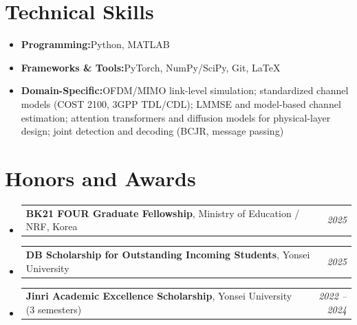 \documentclass[a4paper,11pt]{article}
\makeatletter
\newcommand{\resumeItem}[2]{
    \item{
        \textbf{#1}{\hspace{0.5mm}#2 \vspace{0.3mm}}
    }
}
\newcommand{\resumePOR}[3]{
    \vspace{0.5mm}\item
    \begin{tabular*}{0.97\textwidth}[t]{l@{\extracolsep{\fill}}r}
        \textbf{#1}\hspace{0.3mm}#2 & \textit{\small{#3}}
    \end{tabular*}
    \vspace{-2mm}
}
\newcommand{\resumeSubItem}[2]{
    \resumeItem{#1}{#2}\vspace{-4pt}
}
\newcommand{\resumeSubHeadingListStart}{
    \begin{itemize}[leftmargin=*,labelsep=1mm]
}
\newcommand{\resumeHeadingSkillStart}{
    \begin{itemize}[leftmargin=*,itemsep=1.7mm,rightmargin=2ex]
}
\newcommand{\resumeSubHeadingListEnd}{
    \end{itemize}\vspace{2mm}
}
\newcommand{\resumeHeadingSkillEnd}{
    \end{itemize}\vspace{-2mm}
}
\makeatother
\begin{document}
\vspace{-2mm}


\section{\textbf{Technical Skills}}
\vspace{-0.4mm}

\resumeHeadingSkillStart

\resumeSubItem{Programming:}
{Python, MATLAB}

\resumeSubItem{Frameworks \& Tools:}
{PyTorch, NumPy/SciPy, Git, \LaTeX{}}

\resumeSubItem{Domain-Specific:}
{OFDM/MIMO link-level simulation; standardized channel models (COST 2100, 3GPP TDL/CDL);
LMMSE and model-based channel estimation; attention transformers and diffusion models
for physical-layer design; joint detection and decoding (BCJR, message passing)}

\resumeHeadingSkillEnd
\vspace{-2mm}


\section{\textbf{Honors and Awards}}
\vspace{-0.4mm}

\resumeSubHeadingListStart

\resumePOR
{BK21 FOUR Graduate Fellowship}
{, Ministry of Education / NRF, Korea}
{2025}

\resumePOR
{DB Scholarship for Outstanding Incoming Students}
{, Yonsei University}
{2025}

\resumePOR
{Jinri Academic Excellence Scholarship}
{, Yonsei University (3 semesters)}
{2022 -- 2024}

\resumeSubHeadingListEnd
\vspace{-4mm}


%
%
%
\end{document}
